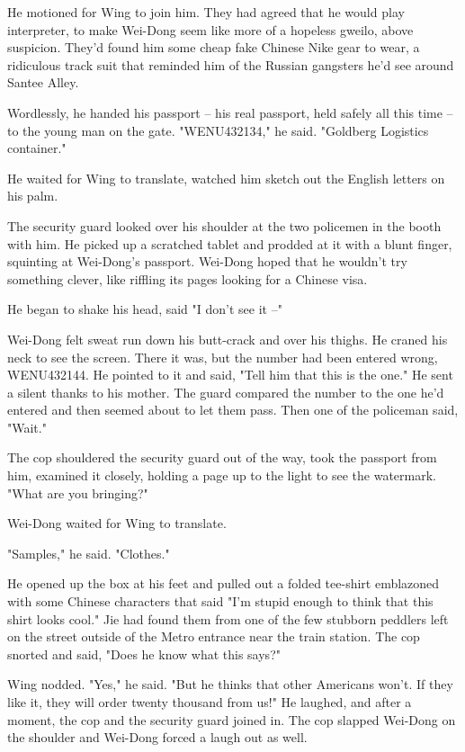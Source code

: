 He motioned for Wing to join him. They had agreed that he would
play interpreter, to make Wei-Dong seem like more of a hopeless
gweilo, above suspicion. They'd found him some cheap fake Chinese
Nike gear to wear, a ridiculous track suit that reminded him of the
Russian gangsters he'd see around Santee Alley.

Wordlessly, he handed his passport -- his real passport, held
safely all this time -- to the young man on the gate. "WENU432134,"
he said. "Goldberg Logistics container."

He waited for Wing to translate, watched him sketch out the English
letters on his palm.

The security guard looked over his shoulder at the two policemen in
the booth with him. He picked up a scratched tablet and prodded at
it with a blunt finger, squinting at Wei-Dong's passport. Wei-Dong
hoped that he wouldn't try something clever, like riffling its
pages looking for a Chinese visa.

He began to shake his head, said "I don't see it --"

Wei-Dong felt sweat run down his butt-crack and over his thighs. He
craned his neck to see the screen. There it was, but the number had
been entered wrong, WENU432144. He pointed to it and said, "Tell
him that this is the one." He sent a silent thanks to his mother.
The guard compared the number to the one he'd entered and then
seemed about to let them pass. Then one of the policeman said,
"Wait."

The cop shouldered the security guard out of the way, took the
passport from him, examined it closely, holding a page up to the
light to see the watermark. "What are you bringing?"

Wei-Dong waited for Wing to translate.

"Samples," he said. "Clothes."

He opened up the box at his feet and pulled out a folded tee-shirt
emblazoned with some Chinese characters that said "I'm stupid
enough to think that this shirt looks cool." Jie had found them
from one of the few stubborn peddlers left on the street outside of
the Metro entrance near the train station. The cop snorted and
said, "Does he know what this says?"

Wing nodded. "Yes," he said. "But he thinks that other Americans
won't. If they like it, they will order twenty thousand from us!"
He laughed, and after a moment, the cop and the security guard
joined in. The cop slapped Wei-Dong on the shoulder and Wei-Dong
forced a laugh out as well.


